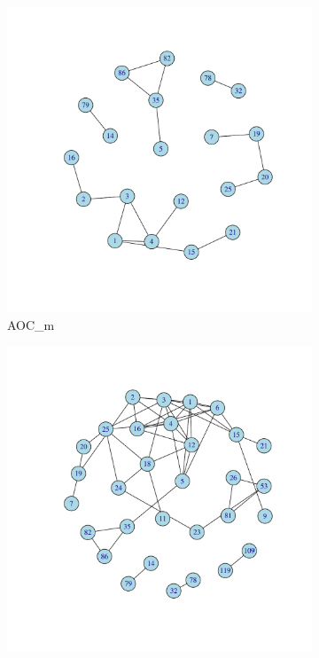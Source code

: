 \documentclass[12pt, oneside]{article}   	%
\begin{document}
\begin{figure}[H]
\centering
\begin{subfigure}[t]{0.48\textwidth}
\centering
\includegraphics[width=0.9\linewidth]{fig7_overlapping_m.pdf}
\caption{AOC\_m}
\end{subfigure}
\hfill
\begin{subfigure}[t]{0.48\textwidth}
\centering
\includegraphics[width=0.9\linewidth]{fig7_overlapping_k.pdf} 

\end{subfigure}
\end{figure}
\end{document}
